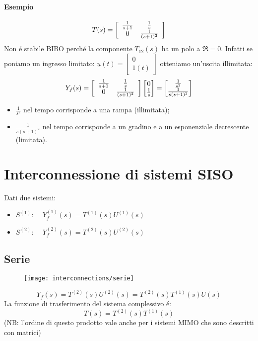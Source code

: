 \documentclass[../main.tex]{subfiles}
\begin{document}
	\paragraph{Esempio}
	\[ T(s) = \left[ \begin{array}{cc} \frac{1}{s+1} & \frac{1}{s}\\ 0 & \frac{1}{(s+1)^2} \end{array} \right] \]
	Non \'e stabile BIBO perch\'e la componente $ T_{12}(s) $ ha un polo a $ \Re = 0 $. Infatti se poniamo un ingresso limitato: $ \underline u(t) = \left[ \begin{matrix} 0\\ 1(t) \end{matrix} \right] $ otteniamo un'uscita illimitata:
	\[ Y_f(s) = \left[ \begin{array}{cc} \frac{1}{s+1} & \frac{1}{s}\\ 0 & \frac{1}{(s+1)^2} \end{array} \right] \left[ \begin{matrix} 0\\ \frac{1}{s} \end{matrix} \right] = \left[ \begin{matrix} \frac{1}{s^2}\\ \frac{1}{s(s+1)^2} \end{matrix} \right] \]
	\begin{itemize}
		\item $ \frac{1}{s^2} $ nel tempo corrisponde a una rampa (illimitata);
		\item $ \frac{1}{s(s+1)^2} $ nel tempo corrisponde a un gradino e a un esponenziale decrescente (limitata).
	\end{itemize}
	\section{Interconnessione di sistemi SISO}
	Dati due sistemi:
	\begin{itemize}
		\item $ S^{(1)} $: $ \quad Y_f^{(1)}(s) = T^{(1)}(s)U^{(1)}(s) $
		\item $ S^{(2)} $: $ \quad Y_f^{(2)}(s) = T^{(2)}(s)U^{(2)}(s) $
	\end{itemize}
	\subsection{Serie}
	\begin{wrapfigure}{R}{.5\linewidth}%
		\centering
		\texttt{[image: interconnections/serie]}%
	\end{wrapfigure}
	\leavevmode%
	\[ Y_f(s) = T^{(2)}(s)U^{(2)}(s) = T^{(2)}(s) T^{(1)}(s) U(s) \]
	La funzione di trasferimento del sistema complessivo \'e:
	\[ T(s) = T^{(2)}(s) T^{(1)}(s) \]
	(NB: l'ordine di questo prodotto vale anche per i sistemi MIMO che sono descritti con matrici)
\end{document}
